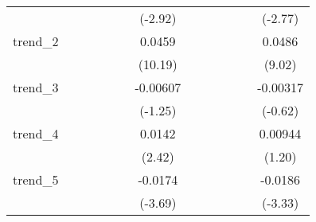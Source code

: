{\begin{tabular}{l*{12}{c}}
            &                     &                     &                     &                     &                     &     (-2.92)         &                     &                     &                     &                     &                     &     (-2.77)         \\
[1em]
trend\_2     &                     &                     &                     &                     &                     &      0.0459\sym{***}&                     &                     &                     &                     &                     &      0.0486\sym{***}\\
            &                     &                     &                     &                     &                     &     (10.19)         &                     &                     &                     &                     &                     &      (9.02)         \\
[1em]
trend\_3     &                     &                     &                     &                     &                     &    -0.00607         &                     &                     &                     &                     &                     &    -0.00317         \\
            &                     &                     &                     &                     &                     &     (-1.25)         &                     &                     &                     &                     &                     &     (-0.62)         \\
[1em]
trend\_4     &                     &                     &                     &                     &                     &      0.0142\sym{*}  &                     &                     &                     &                     &                     &     0.00944         \\
            &                     &                     &                     &                     &                     &      (2.42)         &                     &                     &                     &                     &                     &      (1.20)         \\
[1em]
trend\_5     &                     &                     &                     &                     &                     &     -0.0174\sym{***}&                     &                     &                     &                     &                     &     -0.0186\sym{**} \\
            &                     &                     &                     &                     &                     &     (-3.69)         &                     &                     &                     &                     &                     &     (-3.33)         \\

\end{tabular}}
